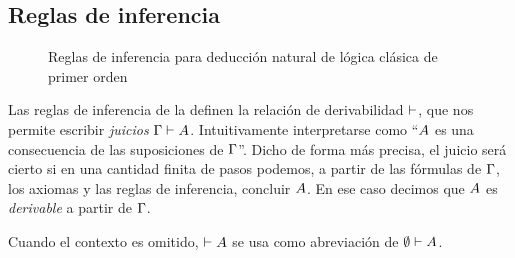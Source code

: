 \subsection{Reglas de inferencia}

\begin{figure}[H]
    \begin{multicols}{2}
        \proofTreeFalseE
        \proofTreeTrueI
    \end{multicols}
    
    \begin{multicols}{2}
        \proofTreeLEM
        \proofTreeAx
    \end{multicols}

    \proofSpacing

    \proofTreeAndI

    \begin{multicols}{2}
        \proofTreeAndEOne
        \proofTreeAndETwo
    \end{multicols}

    \proofSpacing

    \begin{multicols}{2}
        \proofTreeOrIOne
        \proofTreeOrITwo
    \end{multicols}
    
    \proofTreeOrE

    \proofSpacing

    \begin{multicols}{2}
        \proofTreeImpI
        \proofTreeImpE
    \end{multicols}
    \begin{multicols}{2}
        \proofTreeNotI
        \proofTreeNotE
    \end{multicols}

    \proofSpacing

    \begin{multicols}{2}
        \proofTreeForallI
        \proofTreeForallE
    \end{multicols}

    \proofSpacing

    \proofTreeExistsI
    \proofTreeExistsE

    \caption{Reglas de inferencia para deducción natural de lógica clásica de primer orden}
    \label{nd:inference-rules}
\end{figure}


\begin{definition}
    Las reglas de inferencia de la  definen la
    relación de derivabilidad $\vdash$, que nos permite escribir \textit{juicios}
    $\Gamma \vdash A$. Intuitivamente interpretarse como ``$A$ es una
    consecuencia de las suposiciones de $\Gamma$''. Dicho de forma más precisa, el
    juicio será cierto si en una cantidad finita de pasos podemos, a partir de
    las fórmulas de $\Gamma$, los axiomas y las reglas de inferencia, concluir
    $A$. En ese caso decimos que $A$ es \textit{derivable} a partir de
    $\Gamma$.
    
    Cuando el contexto es omitido, $\vdash A$ se usa como abreviación de
    $\emptyset \vdash A$.
\end{definition}

